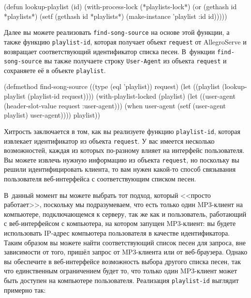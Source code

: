 \begin{myverb}
(defun lookup-playlist (id)
  (with-process-lock (*playlists-lock*)
    (or (gethash id *playlists*)
        (setf (gethash id *playlists*) (make-instance 'playlist :id id)))))
\end{myverb}

Далее вы можете реализовать \lstinline{find-song-source} на основе этой функции, а также
функцию \lstinline{playlist-id}, которая получает объект \lstinline{request} от AllegroServe и
возвращает соответствующий идентификатор списка песен.  В~функции \lstinline{find-song-source}
вы также получаете строку \lstinline{User-Agent} из объекта \lstinline{request} и сохраняете её в
объекте \lstinline{playlist}.

\begin{myverb}
(defmethod find-song-source ((type (eql 'playlist)) request)
  (let ((playlist (lookup-playlist (playlist-id request))))
    (with-playlist-locked (playlist)
      (let ((user-agent (header-slot-value request :user-agent)))
        (when user-agent (setf (user-agent playlist) user-agent))))
    playlist))
\end{myverb}

Хитрость заключается в том, как вы реализуете функцию \lstinline{playlist-id}, которая
извлекает идентификатор из объекта \lstinline{request}.  У вас имеется несколько возможностей,
каждая из которых по-разному влияет на интерфейс пользователя.  Вы можете извлечь нужную
информацию из объекта \lstinline{request}, но поскольку вы решили идентифицировать клиента, то
вам нужен какой-то способ связывания пользователя веб-интерфейса с соответствующим списком
песен.

В~данный момент вы можете выбрать тот подход, который <<просто работает>>, поскольку мы
подразумеваем, что есть только один MP3-клиент на компьютере, подключающемся к серверу,
так же как и пользователь, работающий с веб-интерфейсом с компьютера, на котором запущен
MP3-клиент: вы будете использовать IP-адрес компью\-те\-ра пользователя в качестве
идентификатора.  Таким образом вы можете найти соответствующий список песен для запроса,
вне зависимости от того, пришёл запрос от MP3-клиента или от веб-браузера.  Однако вы
обеспечите в веб-интерфейсе возможность выбора другого списка песен, так что единственным
ограничением будет то, что только один MP3-клиент может быть доступен на компьютере
пользователя.  Реализация \lstinline{playlist-id} выглядит примерно так:

